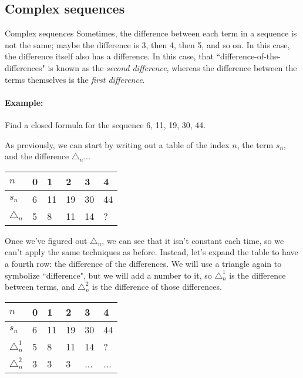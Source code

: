 {    \newpage

    \subsection{Complex sequences}

    \begin{intro}{Complex sequences}
        Sometimes, the difference between each term in a sequence is not the same;
        maybe the difference is 3, then 4, then 5, and so on. In this case,
        the difference itself also has a difference. In this case,
        that ``difference-of-the-differences" is known as the \textit{second difference},
        whereas the difference between the terms themselves is the \textit{first difference}.

        \paragraph{Example:} Find a closed formula for the sequence 6, 11, 19, 30, 44.

        As previously, we can start by writing out a table of the index $n$, the term $s_{n}$,
        and the difference $\triangle_{n}$...

        \begin{center}
            \begin{tabular}{l | l l l l l}
                $n$ & 0 & 1 & 2 & 3 & 4
                \\ \hline
                $s_{n}$ & 6 & 11 & 19 & 30 & 44
                \\ \hline
                $\triangle_{n}$ & 5 & 8 & 11 & 14 & ?
            \end{tabular}
        \end{center}

        Once we've figured out $\triangle_{n}$, we can see that it isn't
        constant each time, so we can't apply the same techniques as before.
        Instead, let's expand the table to have a fourth row: the difference
        of the differences. We will use a triangle again to symbolize ``difference",
        but we will add a number to it, so $\triangle_{n}^{1}$ is the difference
        between terms, and $\triangle_{n}^{2}$ is the difference of those
        differences.
        
        \begin{center}
            \begin{tabular}{l | l l l l l}
                $n$ & 0 & 1 & 2 & 3 & 4
                \\ \hline
                $s_{n}$ & 6 & 11 & 19 & 30 & 44
                \\ \hline
                $\triangle_{n}^{1}$ & 5 & 8 & 11 & 14 & ?
                \\ \hline
                $\triangle_{n}^{2}$ & 3 & 3 & 3 & ... & ...
            \end{tabular}
        \end{center}


\end{intro}}

